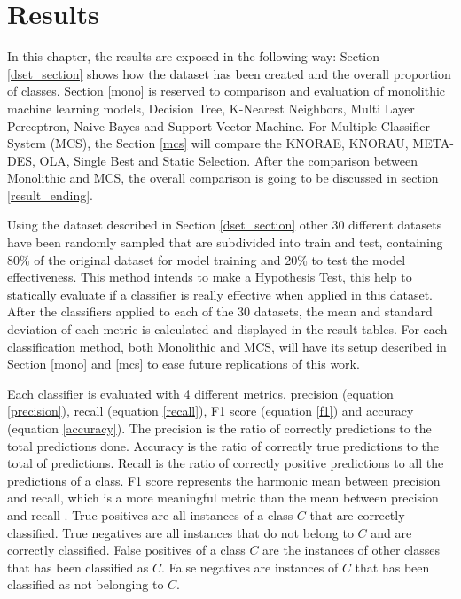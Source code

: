 \chapter{Results}

In this chapter, the results are exposed in the following way: Section \ref{dset_section} shows how the dataset has been created and the overall proportion of classes. Section \ref{mono} is reserved to comparison and evaluation of monolithic machine learning models, Decision Tree, K-Nearest Neighbors, Multi Layer Perceptron, Naive Bayes and Support Vector Machine. For Multiple Classifier System (MCS), the Section \ref{mcs} will compare the KNORAE, KNORAU, META-DES, OLA, Single Best and Static Selection. After the comparison between Monolithic and MCS, the overall comparison is going to be discussed in section \ref{result_ending}.

Using the dataset described in Section \ref{dset_section} other 30 different datasets have been randomly sampled that are subdivided into train and test, containing 80\% of the original dataset for model training and 20\% to test the model effectiveness. This method intends to make a Hypothesis Test, this help to statically evaluate if a classifier is really effective when applied in this dataset. After the classifiers applied to each of the 30 datasets, the mean and standard deviation of each metric is calculated and displayed in the result tables. For each classification method, both Monolithic and MCS, will have its setup described in Section \ref{mono} and \ref{mcs} to ease future replications of this work. 

Each classifier is evaluated with 4 different metrics, precision (equation \ref{precision}), recall (equation \ref{recall}), F1 score (equation \ref{f1}) and accuracy (equation \ref{accuracy}). The precision is the ratio of correctly predictions to the total predictions done. Accuracy is the ratio of correctly true predictions to the total of predictions. Recall is the ratio of correctly positive predictions to all the predictions of a class. F1 score represents the harmonic mean between precision and recall, which is a more meaningful metric than the mean between precision and recall \cite{sasaki2007truth}. True positives are all instances of a class $C$ that are correctly classified. True negatives are all instances that do not belong to $C$ and are correctly classified. False positives of a class $C$ are the instances of other classes that has been classified as $C$. False negatives are instances of $C$ that has been classified as not belonging to $C$.

